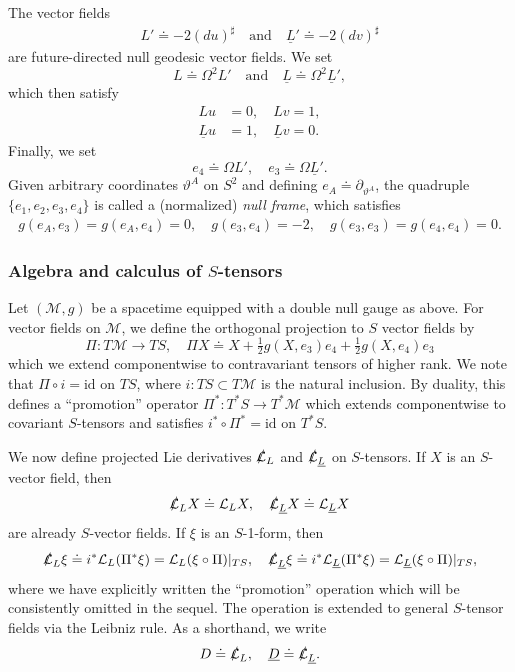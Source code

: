 \documentclass[10pt]{article}
\numberwithin{equation}{section}
\theoremstyle{plain}
\theoremstyle{definition}
\begin{document}
\begin{appendix}
The vector fields
\begin{align*}
    L'\doteq -2(du)^\sharp \quad\text{and}\quad
    \underline L'\doteq -2(dv)^\sharp
\end{align*}
are future-directed null geodesic vector fields. We set 
\[L\doteq\Omega^2 L'\quad\text{and}\quad \underline L \doteq \Omega^2\underline L',\]
which then satisfy 
\begin{align*}
   Lu &=  0,\quad Lv =1,\\
   \underline Lu &=1 ,\quad \underline Lv=0.
\end{align*}
Finally, we set 
\[e_4\doteq \Omega L',\quad e_3\doteq \Omega\underline L'.\]
Given arbitrary coordinates $\vartheta^A$ on $S^2$ and defining $e_A\doteq \partial_{\vartheta^A}$, the quadruple $\{e_1,e_2,e_3,e_4\}$ is called a (normalized) \emph{null frame}, which satisfies 
\begin{align}
    g(e_A,e_3)=g(e_A,e_4)=0,\quad  g(e_3,e_4)=-2, \quad g(e_3,e_3)=g(e_4,e_4)=0.\nonumber
\end{align}


\subsubsection{Algebra and calculus of \texorpdfstring{$S$}{S}-tensors}

Let $(\mathcal M,g)$ be a spacetime equipped with a double null gauge as above. For vector fields on $\mathcal M$, we define the orthogonal projection to $S$ vector fields by 
\[\Pi :T\mathcal M\to TS,\quad \Pi X \doteq X+\tfrac 12g(X,e_3)e_4+\tfrac 12g(X,e_4)e_3\]
which we extend componentwise to contravariant tensors of higher rank. We note that $   \Pi \circ i= \mathrm{id}$ on $TS$, where $i\colon TS \subset T\mathcal M$ is the natural inclusion. By duality, this defines a ``promotion'' operator $\Pi^\ast \colon T^*S \to T^*\mathcal M$ which extends componentwise to covariant $S$-tensors and satisfies $i^*\circ \Pi^* = \mathrm{id}$ on $T^\ast S$.


We now define projected Lie derivatives $\slashed{\mathcal L}_L$ and $\slashed{\mathcal L}_{\underline L}$ on $S$-tensors. If $X$ is an $S$-vector field, then 
\[\slashed{\mathcal L}_L X\doteq \mathcal L_L X,\quad \slashed{\mathcal L}_{\underline L}X\doteq \mathcal L_{\underline L}X\]
are already $S$-vector fields. If $\xi$ is an $S$-1-form, then 
\[\slashed{\mathcal L}_L\xi \doteq i^\ast  \mathcal L_L ( \Pi^* \xi) =  \mathcal L_L(\xi\circ \Pi)|_{TS},\quad\slashed{\mathcal L}_{\underline L}\xi \doteq i^\ast  \mathcal L_{\underline L} ( \Pi^* \xi) = \mathcal L_{\underline L}(\xi\circ \Pi)|_{TS}, \]
where we have explicitly written the ``promotion'' operation which will be consistently omitted in the sequel. The operation is extended to general $S$-tensor fields via the Leibniz rule. As a shorthand, we write 
\[D\doteq \slashed{\mathcal L}_L,\quad \underline D\doteq \slashed{\mathcal L}_{\underline L}.\]


\end{appendix}
\end{document}
